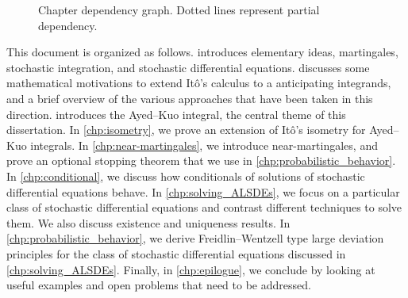 \begin{figure}[ht]
    \centering
    \caption{Chapter dependency graph. Dotted lines represent partial dependency.}
    \label{fig:chapter_dependency_graph}
\end{figure}

This document is organized as follows.  introduces elementary ideas, martingales, stochastic integration, and stochastic differential equations.  discusses some mathematical motivations to extend Itô's calculus to a anticipating integrands, and a brief overview of the various approaches that have been taken in this direction.  introduces the Ayed–Kuo integral, the central theme of this dissertation. In \cref{chp:isometry}, we prove an extension of Itô's isometry for Ayed–Kuo integrals. In \cref{chp:near-martingales}, we introduce near-martingales, and prove an optional stopping theorem that we use in \cref{chp:probabilistic_behavior}. In \cref{chp:conditional}, we discuss how conditionals of solutions of stochastic differential equations behave. In \cref{chp:solving_ALSDEs}, we focus on a particular class of stochastic differential equations and contrast different techniques to solve them. We also discuss existence and uniqueness results. In \cref{chp:probabilistic_behavior}, we derive Freidlin–Wentzell type large deviation principles for the class of stochastic differential equations discussed in \cref{chp:solving_ALSDEs}. Finally, in \cref{chp:epilogue}, we conclude by looking at useful examples and open problems that need to be addressed.

